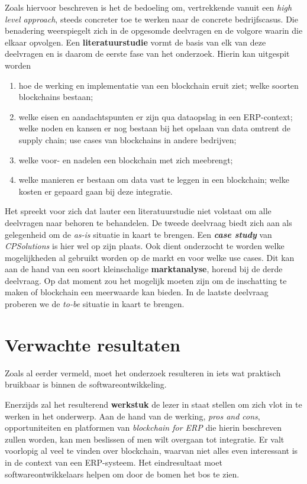 Zoals hiervoor beschreven is het de bedoeling om, vertrekkende vanuit een \textit{high level approach}, steeds concreter toe te werken naar de concrete bedrijfscasus. Die benadering weerspiegelt zich in de opgesomde deelvragen en de volgore waarin die elkaar opvolgen. Een \textbf{literatuurstudie} vormt de basis van elk van deze deelvragen en is daarom de eerste fase van het onderzoek. Hierin kan uitgespit worden
\begin{enumerate}
	\item hoe de werking en implementatie van een blockchain eruit ziet; welke soorten blockchains bestaan;
	\item welke eisen en aandachtspunten er zijn qua dataopslag in een ERP-context; welke noden en kansen er nog bestaan bij het opslaan van data omtrent de supply chain; use cases van blockchains in andere bedrijven;
	\item welke voor- en nadelen een blockchain met zich meebrengt; 
	\item welke manieren er bestaan om data vast te leggen in een blockchain; welke kosten er gepaard gaan bij deze integratie.
\end{enumerate}

Het spreekt voor zich dat lauter een literatuurstudie niet volstaat om alle deelvragen naar behoren te behandelen. 
De tweede deelvraag biedt zich aan als gelegenheid om de \textit{as-is} situatie in kaart te brengen. Een \textbf{\textit{case study}} van \textit{CPSolutions} is hier wel op zijn plaats. Ook dient onderzocht te worden welke mogelijkheden al gebruikt worden op de markt en voor welke use cases. Dit kan aan de hand van een soort kleinschalige \textbf{marktanalyse}, horend bij de derde deelvraag. Op dat moment zou het mogelijk moeten zijn om de inschatting te maken of blockchain een meerwaarde kan bieden. In de laatste deelvraag proberen we de \textit{to-be} situatie in kaart te brengen.


\section{Verwachte resultaten}
\label{sec:verwachte_resultaten}

Zoals al eerder vermeld, moet het onderzoek resulteren in iets wat praktisch bruikbaar is binnen de softwareontwikkeling. 

Enerzijds zal het resulterend \textbf{werkstuk} de lezer in staat stellen om zich vlot in te werken in het onderwerp. Aan de hand van de werking, \textit{pros and cons}, opportuniteiten en platformen van \textit{blockchain for ERP} die hierin beschreven zullen worden, kan men beslissen of men wilt overgaan tot integratie. Er valt voorlopig al veel te vinden over blockchain, waarvan niet alles even interessant is in de context van een ERP-systeem. Het eindresultaat moet softwareontwikkelaars helpen om door de bomen het bos te zien.

